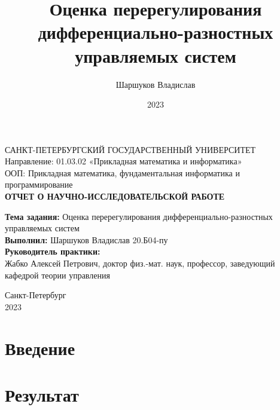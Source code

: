 \documentclass[a4paper,14pt]{article}
\title{Оценка перерегулирования дифференциально-разностных управляемых систем}
\author{Шаршуков Владислав}
\date{2023}
\begin{document}
\begin{titlepage}
  \begin{center}
    САНКТ-ПЕТЕРБУРГСКИЙ ГОСУДАРСТВЕННЫЙ УНИВЕРСИТЕТ \\
    Направление: 01.03.02 «Прикладная математика и информатика» \\
    ООП: Прикладная математика, фундаментальная информатика и программирование \\[4cm]

    \textbf{ОТЧЕТ О НАУЧНО-ИССЛЕДОВАТЕЛЬСКОЙ РАБОТЕ}\\
  \end{center}
  \textbf{Тема задания:} Оценка перерегулирования
  дифференциально-разностных управляемых систем \\[0.5cm]
  \textbf{Выполнил:} Шаршуков Владислав \qquad 20.Б04-пу \\ [1.5cm]
  \textbf{Руководитель практики:} \\Жабко Алексей Петрович,
  доктор физ.-мат. наук, профессор, заведующий кафедрой теории
  управления
  \vspace{5cm}
  \begin{center}
    Санкт-Петербург\\
    2023
  \end{center}
\end{titlepage}

\setcounter{page}{2}

\begin{center}
  \tableofcontents
\end{center}

\newpage

\section{Введение}

\section{Результат}

\newpage

\renewcommand{\refname}{Список использованных источников}
\begin{center}
  \printbibliography{}
\end{center}
\end{document}
